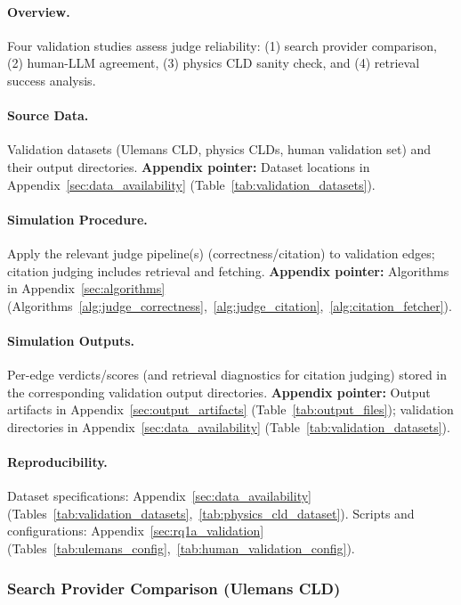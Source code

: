 \paragraph{Overview.}
Four validation studies assess judge reliability: (1) search provider comparison, (2) human-LLM agreement, (3) physics CLD sanity check, and (4) retrieval success analysis.

\paragraph{Source Data.}
Validation datasets (Ulemans CLD, physics CLDs, human validation set) and their output directories.
\textbf{Appendix pointer:} Dataset locations in Appendix~\ref{sec:data_availability} (Table~\ref{tab:validation_datasets}).

\paragraph{Simulation Procedure.}
Apply the relevant judge pipeline(s) (correctness/citation) to validation edges; citation judging includes retrieval and fetching.
\textbf{Appendix pointer:} Algorithms in Appendix~\ref{sec:algorithms} (Algorithms~\ref{alg:judge_correctness},~\ref{alg:judge_citation},~\ref{alg:citation_fetcher}).

\paragraph{Simulation Outputs.}
Per-edge verdicts/scores (and retrieval diagnostics for citation judging) stored in the corresponding validation output directories.
\textbf{Appendix pointer:} Output artifacts in Appendix~\ref{sec:output_artifacts} (Table~\ref{tab:output_files}); validation directories in Appendix~\ref{sec:data_availability} (Table~\ref{tab:validation_datasets}).

\paragraph{Reproducibility.}
Dataset specifications: Appendix~\ref{sec:data_availability} (Tables~\ref{tab:validation_datasets},~\ref{tab:physics_cld_dataset}). Scripts and configurations: Appendix~\ref{sec:rq1a_validation} (Tables~\ref{tab:ulemans_config},~\ref{tab:human_validation_config}).

\subsubsection{Search Provider Comparison (Ulemans CLD)}
\label{sec:ulemans_validation}

